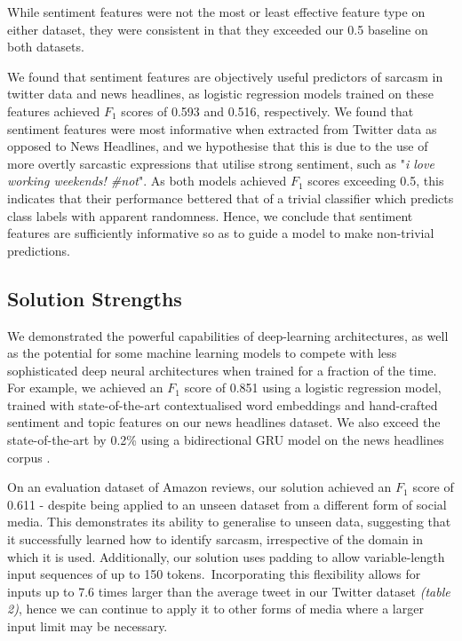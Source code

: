 \documentclass[12pt,a4paper]{article}
\begin{document}
While sentiment features were not the most or least effective feature type on either dataset, they were consistent in that they exceeded our 0.5 baseline on both datasets.\ 

We found that sentiment features are objectively useful predictors of sarcasm in twitter data and news headlines, as logistic regression models trained on these features achieved $F_1$ scores of 0.593 and 0.516, respectively. We found that sentiment features were most informative when extracted from Twitter data as opposed to News Headlines, and we hypothesise that this is due to the use of more overtly sarcastic expressions that utilise strong sentiment, such as "\textit{i love working weekends! \#not}". As both models achieved $F_1$ scores exceeding 0.5, this indicates that their performance bettered that of a trivial classifier which predicts class labels with apparent randomness. Hence, we conclude that sentiment features are sufficiently informative so as to guide a model to make non-trivial predictions.



\subsection{Solution Strengths}\vspace{-10pt}
\noindent We demonstrated the powerful capabilities of deep-learning architectures, as well as the potential for some machine learning models to compete with less sophisticated deep neural architectures when trained for a fraction of the time. For example, we achieved an $F_1$ score of 0.851 using a logistic regression model, trained with state-of-the-art contextualised word embeddings and hand-crafted sentiment and topic features on our news headlines dataset. We also exceed the state-of-the-art by 0.2\% using a bidirectional GRU model on the news headlines corpus \cite{misra2019sarcasm}.





On an evaluation dataset of Amazon reviews, our solution achieved an $F_1$ score of 0.611 - despite being applied to an unseen dataset from a different form of social media. This demonstrates its ability to generalise to unseen data, suggesting that it successfully learned how to identify sarcasm, irrespective of the domain in which it is used. Additionally, our solution uses padding to allow variable-length input sequences of up to 150 tokens.\ Incorporating this flexibility allows for inputs up to 7.6 times larger than the average tweet in our Twitter dataset \textit{(table 2)}, hence we can continue to apply it to other forms of media where a larger input limit may be necessary.
\end{document}

